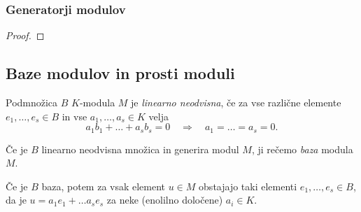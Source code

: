 \subsubsection*{Generatorji modulov}

\begin{definicija}
    
\end{definicija}

\begin{primer}
    
\end{primer}

\begin{definicija}
    
\end{definicija}

\begin{lema}
    
\end{lema}

\begin{proof}
    
\end{proof}

\begin{definicija}
    
\end{definicija}


\subsection{Baze modulov in prosti moduli}

\begin{definicija}
    Podmnožica $B$ $K$-modula $M$ je \emph{linearno neodvisna}, če 
    za vse različne elemente $e_1, \dots, e_s \in B$ in vse $a_1, \dots, a_s \in K$ velja
    \[
        a_1b_1 + \dots + a_sb_s = 0 \quad \Rightarrow \quad a_1 = \dots = a_s = 0.
    \]
\end{definicija}

\begin{definicija}
    Če je $B$ linearno neodvisna množica in generira modul $M$, ji rečemo \emph{baza}
    modula $M$.
\end{definicija}

Če je $B$ baza, potem za vsak element $u \in M$ obstajajo taki elementi $e_1, \dots, e_s \in B$,
da je $u = a_1e_1 + \dots a_se_s$ za neke (enolilno določene) $a_i \in K$.

